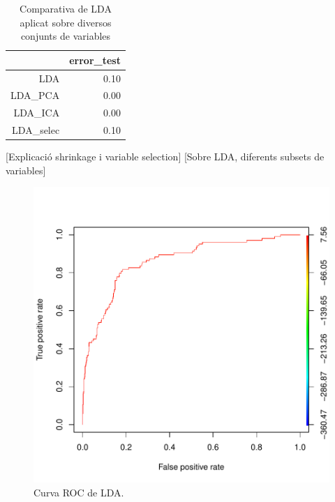 \documentclass[a4paper,10pt]{article}
\begin{document}
\begin{table}[ht]
\begin{center}
\begin{tabular}{rr}
  \hline
 & error\_test \\ 
  \hline
LDA & 0.10 \\ 
  LDA\_PCA & 0.00 \\ 
  LDA\_ICA & 0.00 \\ 
  LDA\_selec & 0.10 \\ 
   \hline
\end{tabular}
\caption{Comparativa de LDA aplicat sobre diversos conjunts de variables}
\label{tab:error_da2}
\end{center}
\end{table}
[Explicació shrinkage i variable selection]
[Sobre LDA, diferents subsets de variables]



\begin{center}
\begin{figure}
\includegraphics[width=5in]{memoria-da_roc}
\caption{Curva ROC de LDA.} \label{fig:da_roc}
\end{figure}
\end{center}
\end{document}
